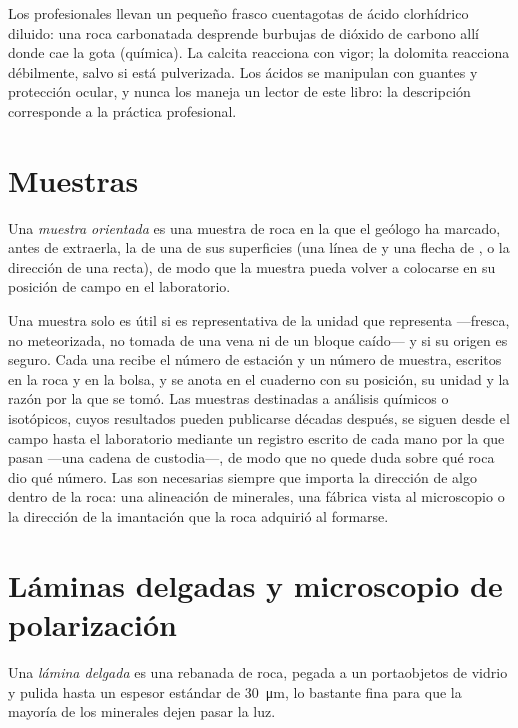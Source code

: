 Los profesionales llevan un pequeño frasco cuentagotas de ácido clorhídrico diluido: una roca carbonatada
desprende burbujas de dióxido de carbono allí donde cae la gota (química). La calcita reacciona con vigor; la
dolomita reacciona débilmente, salvo si está pulverizada.
Los ácidos se manipulan con guantes y protección ocular, y nunca los maneja un lector de este libro:
la descripción corresponde a la práctica profesional.

\section{Muestras}

\begin{definition}\label{def:b1:field-lab-methods-1:sample}
Una \emph{muestra orientada} es una muestra de roca en la que el geólogo ha
marcado, antes de extraerla, la  de una de sus superficies (una línea de  y una flecha de
, o la dirección de una recta), de modo que la muestra pueda volver a colocarse en su posición
de campo en el laboratorio.
\end{definition}

Una muestra solo es útil si es representativa de la unidad que representa ---fresca, no meteorizada,
no tomada de una vena ni de un bloque caído--- y si su origen es seguro. Cada una recibe el número de
estación y un número de muestra, escritos en la roca y en la bolsa, y se anota en el cuaderno con su
posición, su unidad y la razón por la que se tomó. Las muestras destinadas a análisis químicos o
isotópicos, cuyos resultados pueden publicarse décadas después, se siguen desde el campo hasta el
laboratorio mediante un registro escrito de cada mano por la que pasan ---una cadena de custodia---, de
modo que no quede duda sobre qué roca dio qué número. Las  son necesarias siempre que
importa la dirección de algo dentro de la roca: una alineación de minerales, una fábrica vista al
microscopio o la dirección de la imantación que la roca adquirió al formarse.

\section{Láminas delgadas y microscopio de polarización}

\begin{definition}\label{def:b1:field-lab-methods-1:thin-section}
Una \emph{lámina delgada} es una rebanada de roca, pegada a un portaobjetos de vidrio
y pulida hasta un espesor estándar de \qty{30}{\micro\metre}, lo bastante fina para que la mayoría de los
minerales dejen pasar la luz.
\end{definition}

